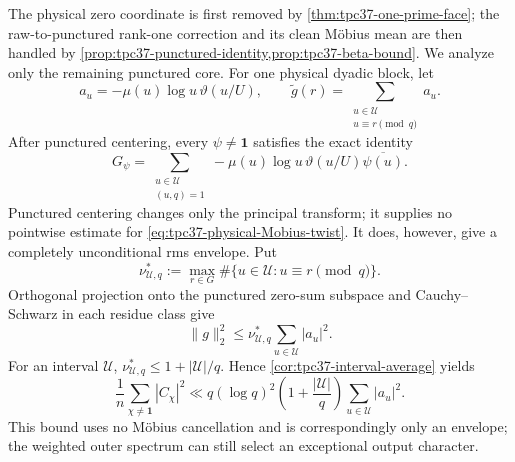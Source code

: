The physical zero coordinate is first removed by
\cref{thm:tpc37-one-prime-face}; the raw-to-punctured rank-one correction
and its clean M\"obius mean are then handled by
\cref{prop:tpc37-punctured-identity,prop:tpc37-beta-bound}.  We analyze
only the remaining punctured core.  For one physical dyadic block, let
\begin{equation}
 a_u=-\mu(u)\log u\,\vartheta(u/U),
 \qquad
 \widetilde g(r)=
 \sum_{\substack{u\in\mathcal U\\u\equiv r\!\!\pmod q}}a_u.
 \label{eq:tpc37-physical-g-residues}
\end{equation}
After punctured centering, every \(\psi\ne\mathbf1\) satisfies the exact
identity
\begin{equation}
 \boxed{
 G_\psi
 =\sum_{\substack{u\in\mathcal U\\(u,q)=1}}
 -\mu(u)\log u\,\vartheta(u/U)\overline{\psi(u)}.}
 \label{eq:tpc37-physical-Mobius-twist}
\end{equation}
Punctured centering changes only the principal transform; it supplies no
pointwise estimate for \eqref{eq:tpc37-physical-Mobius-twist}.
It does, however, give a completely unconditional rms envelope.  Put
\begin{equation}
 \nu_{\mathcal U,q}^*
 :=\max_{r\in G}
 \#\{u\in\mathcal U:u\equiv r\pmod q\}.
 \label{eq:tpc37-u-residue-multiplicity}
\end{equation}
Orthogonal projection onto the punctured zero-sum subspace and
Cauchy--Schwarz in each residue class give
\begin{equation}
 \|g\|_2^2
 \le \nu_{\mathcal U,q}^*
 \sum_{u\in\mathcal U}|a_u|^2.
 \label{eq:tpc37-physical-g-L2}
\end{equation}
For an interval \(\mathcal U\),
\(\nu_{\mathcal U,q}^*\le1+|\mathcal U|/q\).  Hence
\cref{cor:tpc37-interval-average} yields
\begin{equation}
 \boxed{
 \frac1n\sum_{\chi\ne\mathbf1}|C_\chi|^2
 \ll q(\log q)^2
 \left(1+\frac{|\mathcal U|}{q}\right)
 \sum_{u\in\mathcal U}|a_u|^2.}
 \label{eq:tpc37-physical-rms-envelope}
\end{equation}
This bound uses no M\"obius cancellation and is correspondingly only an
envelope; the weighted outer spectrum can still select an exceptional
output character.

